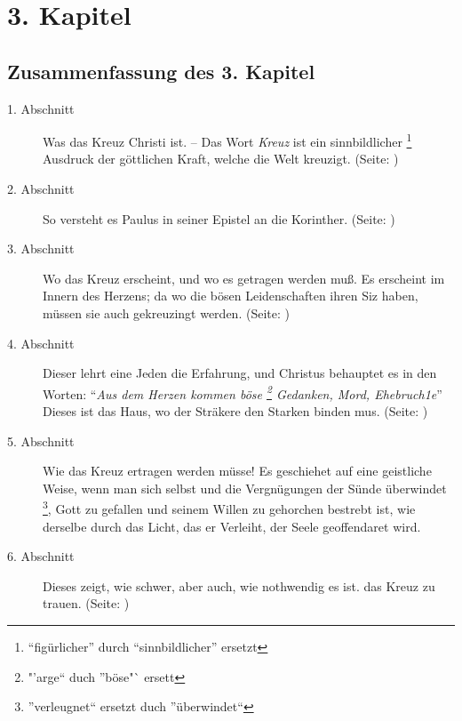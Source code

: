 

\chapter{3. Kapitel} \label{kap3}

\section{Zusammenfassung des 3. Kapitel}

\footnotesize
\begin{description}
\item[1. Abschnitt] Was das Kreuz Christi ist. -- Das Wort \textit{Kreuz} ist ein
sinnbildlicher \footnote{"`figürlicher"' durch "`sinnbildlicher"' ersetzt} 
Ausdruck der göttlichen Kraft, welche die Welt kreuzigt.
(Seite: \pageref{kap3_ab1})
\item[2. Abschnitt] So versteht es Paulus in seiner Epistel an die
Korinther. (Seite: \pageref{kap3_ab2})
\item[3. Abschnitt] Wo das Kreuz erscheint, und wo es getragen werden muß. Es
erscheint im Innern des Herzens; da wo die bösen Leidenschaften ihren Siz haben,
müssen sie auch gekreuzingt werden. (Seite: \pageref{kap3_ab3})
\item[4. Abschnitt] Dieser lehrt eine Jeden die Erfahrung, und Christus
behauptet es in den Worten: "`\textit{Aus dem Herzen kommen böse \footnote{
"'arge"` duch "'böse"` ersett} Gedanken, Mord,
Ehebruch1e}"' Dieses ist das Haus, wo der Sträkere den Starken binden mus.
(Seite: \pageref{kap3_ab4})
\item[5. Abschnitt] Wie das Kreuz ertragen werden müsse! Es geschiehet auf eine
geistliche Weise, wenn man sich selbst und die Vergnügungen der Sünde überwindet
\footnote{''verleugnet`` ersetzt duch ''überwindet``}, Gott zu gefallen und 
seinem Willen zu gehorchen bestrebt ist, wie
derselbe durch das Licht, das er Verleiht, der Seele geoffendaret wird.
\item[6. Abschnitt] Dieses zeigt, wie schwer, aber auch, wie nothwendig es ist.
das Kreuz zu trauen. (Seite: \pageref{kap3_ab5})
\end{description}
\normalsize

